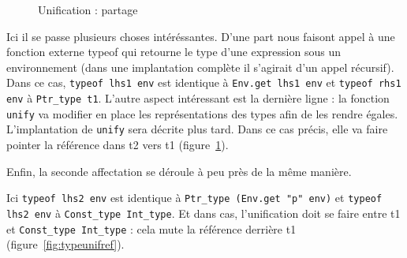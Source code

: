 \begin{figure}
  \centering
  \caption{Unification : partage}
  \label{fig:unifsharing}
\end{figure}

Ici il se passe plusieurs choses intéréssantes. D'une part nous faisont appel à
une fonction externe typeof qui retourne le type d'une expression sous un
environnement (dans une implantation complète il s'agirait d'un appel récursif).
Dans ce cas, \texttt{typeof lhs1 env} est identique à \texttt{Env.get lhs1 env}
et \texttt{typeof rhs1 env} à \texttt{Ptr\_type t1}. L'autre aspect intéressant
est la dernière ligne : la fonction \texttt{unify} va modifier en place les
représentations des types afin de les rendre égales. L'implantation de
\texttt{unify} sera décrite plus tard. Dans ce cas précis, elle va faire pointer
la référence dans t2 vers t1 (figure~\ref{fig:unifsharing}).

Enfin, la seconde affectation se déroule à peu près de la même manière.


Ici \texttt{typeof lhs2 env} est identique à \texttt{Ptr\_type (Env.get "p"
env)} et \texttt{typeof lhs2 env} à \texttt{Const\_type Int\_type}. Et dans cas,
l'unification doit se faire entre t1 et \texttt{Const\_type Int\_type} : cela
mute la référence derrière t1 (figure~\ref{fig:typeunifref}).

